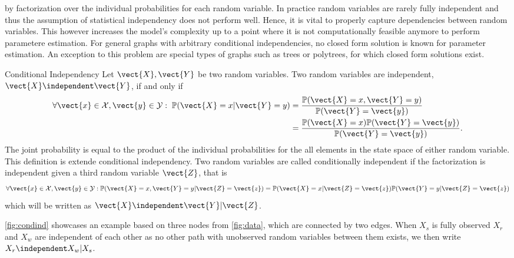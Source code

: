 by factorization over the individual probabilities for each random variable.
In practice random variables are rarely fully independent and thus the assumption of statistical independency does not perform well.
Hence, it is vital to properly capture dependencies between random variables.
This however increases the model's complexity up to a point where it is not computationally feasible anymore to perform parametere estimation.
For general graphs with arbitrary conditional independencies, no closed form solution is known for parameter estimation. 
An exception to this problem are special types of graphs such as trees or polytrees, for which closed form solutions exist.
\begin{definition}{Conditional Independency}
    Let $\vect{X}, \vect{Y}$ be two random variables. Two random variables are independent,  $\vect{X} \independent \vect{Y}$, if and only if
    \begin{equation}
        \begin{split}
        \forall \vect{x} \in \mathcal{X}, \vect{y} \in \mathcal{Y}:  \; \mathbb{P}(\vect{X} = x \lvert \vect{Y} = y) &= \frac{\mathbb{P}(\vect{X} = x , \vect{Y} = y)}{\mathbb{P}(\vect{Y} = \vect{y})} \\
        &=  \frac{\mathbb{P}(\vect{X} = x) \mathbb{P}(\vect{Y} = \vect{y})}{\mathbb{P}(\vect{Y} = \vect{y})}.  \\
        \end{split}
    \end{equation} 
    The joint probability is equal to the product of the individual probabilities for the all elements in the state space of either random variable.
    This definition is extende conditional independency. 
    Two random variables are called conditionally independent if the factorization is independent given a third random variable $\vect{Z}$, that is
    \begin{equation}
        \forall \vect{x} \in \mathcal{X}, \vect{y} \in \mathcal{Y}: \mathbb{P}(\vect{X} = x , \vect{Y} = y \lvert \vect{Z} = \vect{z}) =   \mathbb{P}(\vect{X} = x \lvert \vect{Z} = \vect{z}) \mathbb{P}(\vect{Y} = y \lvert \vect{Z} = \vect{z})
    \end{equation}
    which will be written as $\vect{X} \independent \vect{Y} \lvert \vect{Z}$.

    \fig \ref{fig:condind} showcases an example based on three nodes from \fig \ref{fig:data}, which are connected by two edges. 
    When $X_s$ is fully observed $X_r$ and $X_w$ are independent of each other as no other path with unobserved random variables between them exists, we then write $X_r \independent X_w \lvert X_s$.   
            

\end{definition}

